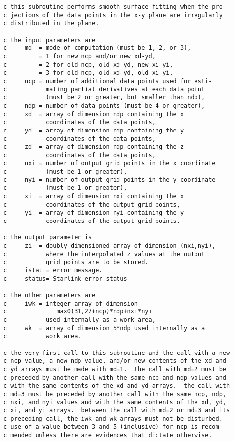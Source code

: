  

\begin{verbatim}
c this subroutine performs smooth surface fitting when the pro-
c jections of the data points in the x-y plane are irregularly
c distributed in the plane.
 
c the input parameters are
c     md  = mode of computation (must be 1, 2, or 3),
c         = 1 for new ncp and/or new xd-yd,
c         = 2 for old ncp, old xd-yd, new xi-yi,
c         = 3 for old ncp, old xd-yd, old xi-yi,
c     ncp = number of additional data points used for esti-
c           mating partial derivatives at each data point
c           (must be 2 or greater, but smaller than ndp),
c     ndp = number of data points (must be 4 or greater),
c     xd  = array of dimension ndp containing the x
c           coordinates of the data points,
c     yd  = array of dimension ndp containing the y
c           coordinates of the data points,
c     zd  = array of dimension ndp containing the z
c           coordinates of the data points,
c     nxi = number of output grid points in the x coordinate
c           (must be 1 or greater),
c     nyi = number of output grid points in the y coordinate
c           (must be 1 or greater),
c     xi  = array of dimension nxi containing the x
c           coordinates of the output grid points,
c     yi  = array of dimension nyi containing the y
c           coordinates of the output grid points.
 
c the output parameter is
c     zi  = doubly-dimensioned array of dimension (nxi,nyi),
c           where the interpolated z values at the output
c           grid points are to be stored.
c     istat = error message.
c     status= Starlink error status
 
c the other parameters are
c     iwk = integer array of dimension
c              max0(31,27+ncp)*ndp+nxi*nyi
c           used internally as a work area,
c     wk  = array of dimension 5*ndp used internally as a
c           work area.
 
c the very first call to this subroutine and the call with a new
c ncp value, a new ndp value, and/or new contents of the xd and
c yd arrays must be made with md=1.  the call with md=2 must be
c preceded by another call with the same ncp and ndp values and
c with the same contents of the xd and yd arrays.  the call with
c md=3 must be preceded by another call with the same ncp, ndp,
c nxi, and nyi values and with the same contents of the xd, yd,
c xi, and yi arrays.  between the call with md=2 or md=3 and its
c preceding call, the iwk and wk arrays must not be disturbed.
c use of a value between 3 and 5 (inclusive) for ncp is recom-
c mended unless there are evidences that dictate otherwise.
 

\end{verbatim}
